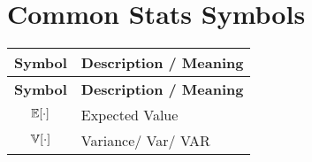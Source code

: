 \section*{Common Stats Symbols}

\begin{customArrayStretch}{1.2}
\begin{longtable}{| c | l |}


\hline
\textbf{Symbol} & \textbf{Description / Meaning} \\
\hline
\endfirsthead

\hline
\textbf{Symbol} & \textbf{Description / Meaning} \\
\hline
\endhead


\hline\endfoot
\hline\endlastfoot


$\mathbb{E}[\cdot]$ & Expected Value \\ \hline

$\mathbb{V}[\cdot]$ & Variance/ Var/ VAR \\ \hline


\end{longtable}
\end{customArrayStretch}



